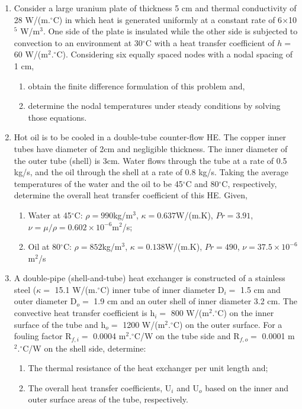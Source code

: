 \documentclass[12pts,a4paper,amsmath,amssymb,floatfix]{article}%
\begin{document}
\begin{enumerate}[label=\bfseries Problem \arabic*:]
\item\label{Problem:FDM_Plate} Consider a large uranium plate of thickness 5 cm and thermal conductivity of 28 W/(m.$^{\circ}$C) in which heat is generated uniformly at a constant rate of 6$\times$10$^{5}$ W/m$^{3}$. One side of the plate is insulated while the other side is subjected to convection to an environment at 30$^{\circ}$C with a heat transfer coefficient of $h=$ 60 W/(m$^{2}.^{\circ}$C). Considering six equally spaced nodes with a nodal spacing of 1 cm,
\begin{enumerate}
  \item obtain the finite difference formulation of this problem and,
  \item determine the nodal temperatures under steady conditions by solving those equations.
\end{enumerate}



\item\label{Problem:HE_Example1} Hot oil is to be cooled in a double-tube counter-flow HE. The copper inner tubes have diameter of 2cm and negligible thickness. The inner diameter of the outer tube (shell) is 3cm. Water flows through the tube at a rate of 0.5 kg/s, and the oil through the shell at a rate of 0.8 kg/s. Taking the average temperatures of the water and the oil to be 45$^{\circ}$C and 80$^{\circ}$C, respectively, determine the overall heat transfer coefficient of this HE. Given, 
\begin{enumerate} 
    \item Water at 45$^{\circ}$C: $\rho=990$kg/m$^{3}$, $\kappa=0.637$W/(m.K), $Pr=3.91$, $\nu=\mu/\rho=0.602\times 10^{-6}$m$^{2}$/s; 
    \item Oil at 80$^{\circ}$C: $\rho=852$kg/m$^{3}$, $\kappa=0.138$W/(m.K), $Pr=490$, $\nu=37.5\times 10^{-6}$m$^{2}$/s
\end{enumerate}


\item\label{Problem:HE_Example2} A double-pipe (shell-and-tube) heat exchanger is constructed of a stainless steel ($\kappa=$ 15.1 W/(m.$^{\circ}$C) inner tube of inner diameter D$_{i}=$ 1.5 cm and outer diameter D$_{o}=$ 1.9 cm and an outer shell of inner diameter 3.2 cm. The convective heat transfer coefficient is h$_{i}=$ 800 W/(m$^{2}.^{\circ}$C) on the inner surface of the tube and h$_{o}=$ 1200 W/(m$^{2}.^{\circ}$C) on the outer surface. For a fouling factor R$_{f,i}=$ 0.0004 m$^{2}.^{\circ}$C/W on the tube side and R$_{f,o}=$ 0.0001 m$^{2}.^{\circ}$C/W on the shell side, determine:
\begin{enumerate}
   \item The thermal resistance of the heat exchanger per unit length and; 
   \item The overall heat transfer coefficients, U$_{i}$ and U$_{o}$ based on the inner and outer surface areas of the tube, respectively.
\end{enumerate}


\end{enumerate}
\end{document}
